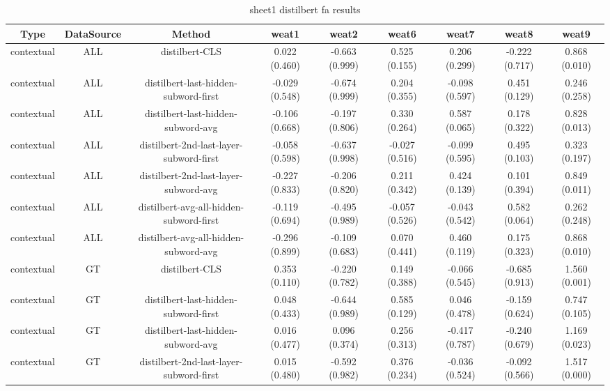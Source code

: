 \begin{sidewaystable}[htb]
    \centering
    \caption{sheet1 distilbert fa results}
    \label{appendix_tab:sheet1_distilbert_fa_results}
    \small
    \begin{tabular}{@{}ccccccccc@{}}
        \toprule
        Type & DataSource & Method & weat1 & weat2 & weat6 & weat7 & weat8 & weat9 \\
        \midrule
        contextual & ALL & distilbert-CLS & 0.022 (0.460) & -0.663 (0.999) & 0.525 (0.155) & 0.206 (0.299) & -0.222 (0.717) & 0.868 (0.010) \\
        contextual & ALL & distilbert-last-hidden-subword-first & -0.029 (0.548) & -0.674 (0.999) & 0.204 (0.355) & -0.098 (0.597) & 0.451 (0.129) & 0.246 (0.258) \\
        contextual & ALL & distilbert-last-hidden-subword-avg & -0.106 (0.668) & -0.197 (0.806) & 0.330 (0.264) & 0.587 (0.065) & 0.178 (0.322) & 0.828 (0.013) \\
        contextual & ALL & distilbert-2nd-last-layer-subword-first & -0.058 (0.598) & -0.637 (0.998) & -0.027 (0.516) & -0.099 (0.595) & 0.495 (0.103) & 0.323 (0.197) \\
        contextual & ALL & distilbert-2nd-last-layer-subword-avg & -0.227 (0.833) & -0.206 (0.820) & 0.211 (0.342) & 0.424 (0.139) & 0.101 (0.394) & 0.849 (0.011) \\
        contextual & ALL & distilbert-avg-all-hidden-subword-first & -0.119 (0.694) & -0.495 (0.989) & -0.057 (0.526) & -0.043 (0.542) & 0.582 (0.064) & 0.262 (0.248) \\
        contextual & ALL & distilbert-avg-all-hidden-subword-avg & -0.296 (0.899) & -0.109 (0.683) & 0.070 (0.441) & 0.460 (0.119) & 0.175 (0.323) & 0.868 (0.010) \\
        contextual & GT & distilbert-CLS & 0.353 (0.110) & -0.220 (0.782) & 0.149 (0.388) & -0.066 (0.545) & -0.685 (0.913) & 1.560 (0.001) \\
        contextual & GT & distilbert-last-hidden-subword-first & 0.048 (0.433) & -0.644 (0.989) & 0.585 (0.129) & 0.046 (0.478) & -0.159 (0.624) & 0.747 (0.105) \\
        contextual & GT & distilbert-last-hidden-subword-avg & 0.016 (0.477) & 0.096 (0.374) & 0.256 (0.313) & -0.417 (0.787) & -0.240 (0.679) & 1.169 (0.023) \\
        contextual & GT & distilbert-2nd-last-layer-subword-first & 0.015 (0.480) & -0.592 (0.982) & 0.376 (0.234) & -0.036 (0.524) & -0.092 (0.566) & 1.517 (0.000) \\

\end{tabular}
\end{sidewaystable}
